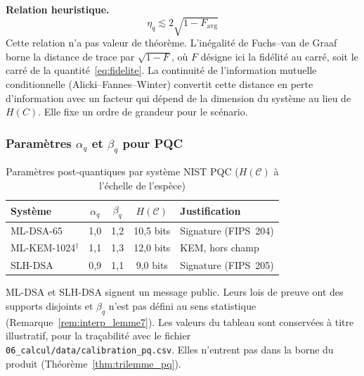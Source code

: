 \begin{sloppypar}
\noindent\textbf{Relation heuristique.}
\begin{equation}
\eta_q \lesssim 2\sqrt{1 - F_{\mathrm{avg}}}
\label{eq:relation_eta_q_fidelite}
\end{equation}
Cette relation n'a pas valeur de th\'eor\`eme. L'in\'egalit\'e de Fuchs--van de Graaf
borne la distance de trace par $\sqrt{1-F}$, o\`u $F$ d\'esigne ici la fid\'elit\'e au carr\'e,
soit le carr\'e de la quantit\'e~\eqref{eq:fidelite}. La continuit\'e de l'information
mutuelle conditionnelle (Alicki--Fannes--Winter) convertit cette distance en perte
d'information avec un facteur qui d\'epend de la dimension du syst\`eme au lieu de
$H(C)$. Elle fixe un ordre de grandeur pour le sc\'enario.

\subsubsection{Param\`etres $\alpha_q$ et $\beta_q$ pour PQC}
\label{subsec:parametres_alpha_q_beta_q}

\begin{table}[htbp]
\centering
\caption{Param\`etres post-quantiques par syst\`eme NIST PQC ($H(\mathcal{C})$ \`a l'\'echelle de l'esp\`ece)}
\label{tab:parametres_alpha_q_beta_q}
\begin{tabular}{@{}lcccl@{}}
\toprule
\textbf{Syst\`eme} & $\alpha_q$ & $\beta_q$ & $H(\mathcal{C})$ &
\textbf{Justification} \\
\midrule
ML-DSA-65 & 1{,}0 & 1{,}2 & 10{,}5 bits & Signature (FIPS~204) \\
ML-KEM-1024$^\dagger$ & 1{,}1 & 1{,}3 & 12{,}0 bits & KEM, hors champ \\
SLH-DSA & 0{,}9 & 1{,}1 & 9{,}0 bits & Signature (FIPS~205) \\
\bottomrule
\end{tabular}

\smallskip
{\footnotesize ML-DSA et SLH-DSA signent un message public. Leurs lois de preuve ont des supports disjoints et $\beta_q$ n'est pas d\'efini au sens statistique (Remarque~\ref{rem:interp_lemme7}). Les valeurs du tableau sont conserv\'ees \`a titre illustratif, pour la tra\c{c}abilit\'e avec le fichier \texttt{06\_calcul/data/calibration\_pq.csv}. Elles n'entrent pas dans la borne du produit (Th\'eor\`eme~\ref{thm:trilemme_pq}).\par}
\end{table}
\end{sloppypar}

